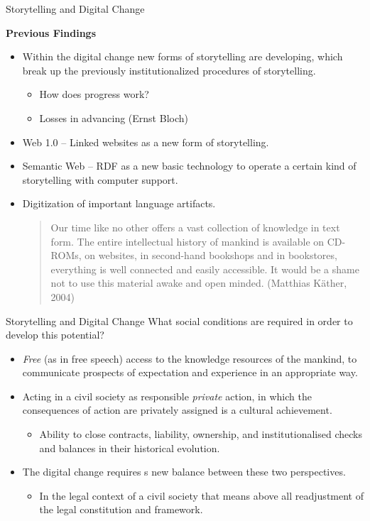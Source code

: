 \documentclass{beamer}
\newcommand{\ueberschrift}[1]{\begin{center}\bf #1\end{center}}
\begin{document}
\begin{frame}{Storytelling and Digital Change}
\ueberschrift{Previous Findings}
\begin{itemize}
\item Within the digital change new forms of storytelling are developing,
  which break up the previously institutionalized procedures of storytelling.
  \begin{itemize}
  \item How does progress work?
  \item Losses in advancing (Ernst Bloch)
  \end{itemize}
\item Web 1.0 -- Linked websites as a new form of storytelling.
\item Semantic Web -- RDF as a new basic technology to operate a certain kind
  of storytelling with computer support.
\item Digitization of important language artifacts.
  \begin{quote}\small
    Our time like no other offers a vast collection of knowledge in text form.
    The entire intellectual history of mankind is available on CD-ROMs, on
    websites, in second-hand bookshops and in bookstores, everything is well
    connected and easily accessible.  It would be a shame not to use this
    material awake and open minded. (Matthias Käther, 2004)
  \end{quote}
\end{itemize}\vspace*{2em}
\end{frame}

\begin{frame}{Storytelling and Digital Change}
What social conditions are required in order to develop this potential?
\begin{itemize}
\item \emph{Free} (as in free speech) access to the knowledge resources of the
  mankind, to communicate prospects of expectation and experience in an
  appropriate way.
\item Acting in a civil society as responsible \emph{private} action, in which
  the consequences of action are privately assigned is a cultural achievement.
  \begin{itemize}
  \item Ability to close contracts, liability, ownership, and
    institutionalised checks and balances in their historical evolution.
  \end{itemize}
\item The digital change requires s new balance between these two
  perspectives.
  \begin{itemize}
  \item In the legal context of a civil society that means above all
    readjustment of the legal constitution and framework.
  \end{itemize}
\end{itemize}
\end{frame}
\end{document}
